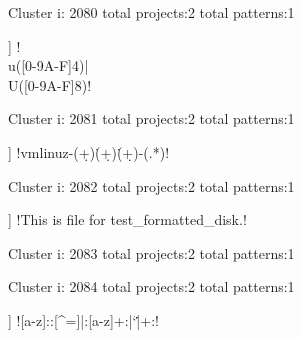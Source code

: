 Cluster i: 2080
total projects:2
total patterns:1
\begin{multicols}{1}
\begin{description}[noitemsep,topsep=0pt]
\item [[2] ] \cverb!\\u([0-9A-F]{4})|\\U([0-9A-F]{8})!
\end{description}
\end{multicols}







Cluster i: 2081
total projects:2
total patterns:1
\begin{multicols}{1}
\begin{description}[noitemsep,topsep=0pt]
\item [[2] ] \cverb!vmlinuz-(\d+)\.(\d+)\.(\d+)-(.*)!
\end{description}
\end{multicols}







Cluster i: 2082
total projects:2
total patterns:1
\begin{multicols}{1}
\begin{description}[noitemsep,topsep=0pt]
\item [[2] ] \cverb!This is file for test_formatted_disk.!
\end{description}
\end{multicols}







Cluster i: 2083
total projects:2
total patterns:1
\begin{multicols}{1}
\end{multicols}







Cluster i: 2084
total projects:2
total patterns:1
\begin{multicols}{1}
\begin{description}[noitemsep,topsep=0pt]
\item [[2] ] \cverb![a-z]::[^=]|:[a-z]+:|`|\.\.\s*\w+:!
\end{description}
\end{multicols}







